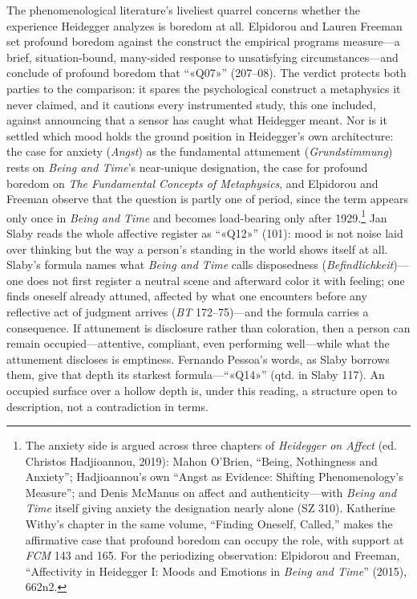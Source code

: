 The phenomenological literature's liveliest quarrel concerns whether the experience Heidegger
analyzes is boredom at all. Elpidorou and Lauren Freeman set profound boredom against the
construct the empirical programs measure---a brief, situation-bound, many-sided response to
unsatisfying circumstances---and conclude of profound boredom that ``«Q07»'' (207--08). The
verdict protects both parties to the comparison: it spares the psychological construct a
metaphysics it never claimed, and it cautions every instrumented study, this one included,
against announcing that a sensor has caught what Heidegger meant. Nor is it settled which
mood holds the ground position in Heidegger's own architecture: the case for anxiety
(\textit{Angst}) as the fundamental attunement (\textit{Grundstimmung}) rests on
\textit{Being and Time}'s near-unique designation, the case for profound boredom on
\textit{The Fundamental Concepts of Metaphysics}, and Elpidorou and Freeman observe that the
question is partly one of period, since the term appears only once in \textit{Being and Time}
and becomes load-bearing only after 1929.\footnote{The anxiety side is argued across three
chapters of \textit{Heidegger on Affect} (ed. Christos Hadjioannou, 2019): Mahon O'Brien,
``Being, Nothingness and Anxiety''; Hadjioannou's own ``Angst as Evidence: Shifting
Phenomenology's Measure''; and Denis McManus on affect and authenticity---with \textit{Being and Time}
itself giving anxiety the designation nearly alone (SZ 310). Katherine Withy's chapter in the
same volume, ``Finding Oneself, Called,'' makes the affirmative case that profound boredom
can occupy the role, with support at \textit{FCM} 143 and 165. For the periodizing
observation: Elpidorou and Freeman, ``Affectivity in Heidegger I: Moods and Emotions in
\textit{Being and Time}'' (2015), 662n2.} Jan Slaby reads the whole affective register as
``«Q12»'' (101): mood is not noise laid over thinking but the way a person's standing in the
world shows itself at all. Slaby's formula names what \textit{Being and Time} calls
disposedness (\textit{Befindlichkeit})---one does not first register a neutral scene and
afterward color it with feeling; one finds oneself already attuned, affected by what one
encounters before any reflective act of judgment arrives (\textit{BT} 172--75)---and the
formula carries a consequence. If attunement is disclosure rather than coloration, then a
person can remain occupied---attentive, compliant, even performing well---while what the
attunement discloses is emptiness. Fernando Pessoa's words, as Slaby borrows them, give that
depth its starkest formula---``«Q14»'' (qtd. in Slaby 117). An occupied surface over a hollow
depth is, under this reading, a structure open to description, not a contradiction in terms.

